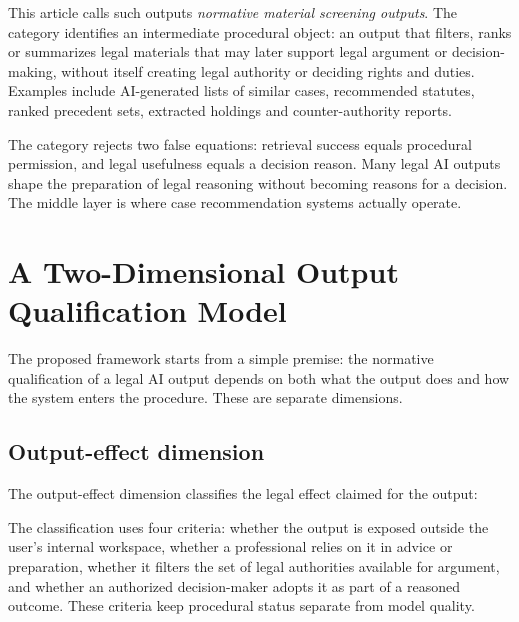 \documentclass[12pt,a4paper]{article}
\begin{document}
This article calls such outputs \textit{normative material screening outputs}. The category identifies an intermediate procedural object: an output that filters, ranks or summarizes legal materials that may later support legal argument or decision-making, without itself creating legal authority or deciding rights and duties. Examples include AI-generated lists of similar cases, recommended statutes, ranked precedent sets, extracted holdings and counter-authority reports.

The category rejects two false equations: retrieval success equals procedural permission, and legal usefulness equals a decision reason. Many legal AI outputs shape the preparation of legal reasoning without becoming reasons for a decision. The middle layer is where case recommendation systems actually operate.

\section{A Two-Dimensional Output Qualification Model}

The proposed framework starts from a simple premise: the normative qualification of a legal AI output depends on both what the output does and how the system enters the procedure. These are separate dimensions.

\subsection{Output-effect dimension}

The output-effect dimension classifies the legal effect claimed for the output:

The classification uses four criteria: whether the output is exposed outside the user's internal workspace, whether a professional relies on it in advice or preparation, whether it filters the set of legal authorities available for argument, and whether an authorized decision-maker adopts it as part of a reasoned outcome. These criteria keep procedural status separate from model quality.
\end{document}
